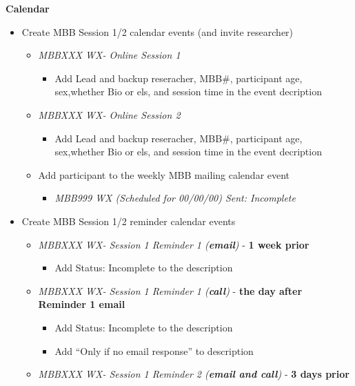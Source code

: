 \documentclass[
]{book}
\providecommand{\tightlist}{%
  \setlength{\itemsep}{0pt}\setlength{\parskip}{0pt}}
\begin{document}
\textbf{Calendar}

\begin{itemize}
\tightlist
\item
  Create MBB Session 1/2 calendar events (and invite researcher)

  \begin{itemize}
  \tightlist
  \item
    \emph{MBBXXX WX- Online Session 1}

    \begin{itemize}
    \tightlist
    \item
      Add Lead and backup reseracher, MBB\#, participant age, sex,whether Bio or els, and session time in the event decription
    \end{itemize}
  \item
    \emph{MBBXXX WX- Online Session 2}

    \begin{itemize}
    \tightlist
    \item
      Add Lead and backup reseracher, MBB\#, participant age, sex,whether Bio or els, and session time in the event decription
    \end{itemize}
  \item
    Add participant to the weekly MBB mailing calendar event

    \begin{itemize}
    \tightlist
    \item
      \emph{MBB999 WX (Scheduled for 00/00/00) Sent: Incomplete}
    \end{itemize}
  \end{itemize}
\item
  Create MBB Session 1/2 reminder calendar events

  \begin{itemize}
  \tightlist
  \item
    \emph{MBBXXX WX- Session 1 Reminder 1 (\textbf{email})} - \textbf{1 week prior}

    \begin{itemize}
    \tightlist
    \item
      Add Status: Incomplete to the description
    \end{itemize}
  \item
    \emph{MBBXXX WX- Session 1 Reminder 1 (\textbf{call})} - \textbf{the day after Reminder 1 email}

    \begin{itemize}
    \tightlist
    \item
      Add Status: Incomplete to the description
    \item
      Add ``Only if no email response'' to description
    \end{itemize}
  \item
    \emph{MBBXXX WX- Session 1 Reminder 2 (\textbf{email and call})} - \textbf{3 days prior}


\end{itemize}
\end{itemize}
\end{document}
